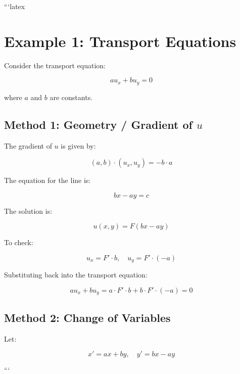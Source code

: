 ```latex
\section*{Example 1: Transport Equations}

Consider the transport equation:

\begin{equation}
    a u_x + b u_y = 0
\end{equation}

where \(a\) and \(b\) are constants.

\subsection*{Method 1: Geometry / Gradient of \(u\)}

The gradient of \(u\) is given by:

\[
(a, b) \cdot (u_x, u_y) = -b \cdot a
\]

The equation for the line is:

\begin{equation}
    bx - ay = c
\end{equation}

The solution is:

\[
u(x, y) = F(bx - ay)
\]

To check:

\[
u_x = F' \cdot b, \quad u_y = F' \cdot (-a)
\]

Substituting back into the transport equation:

\[
a u_x + b u_y = a \cdot F' \cdot b + b \cdot F' \cdot (-a) = 0
\]

\subsection*{Method 2: Change of Variables}

Let:

\[
x' = ax + by, \quad y' = bx - ay
\]

```
